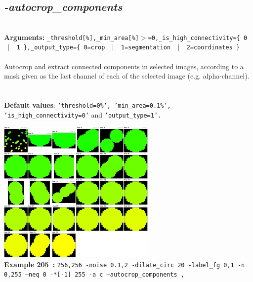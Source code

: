 \documentclass[a4paper,11pt,twoside]{book}
\begin{document}
\subsection{\emph{-autocrop\_components} }\vspace*{-0.5em}
~\\\textbf{Arguments: } 
{\small \texttt{\_threshold[\%],\_min\_area[\%]$>$=0,\_is\_high\_connectivity=\{ 0 ~$|$~ 1 \},\_output\_type=\{ 0=crop ~$|$~ 1=segmentation ~$|$~ 2=coordinates \}}}\\~\\
Autocrop and extract connected components in selected images, according to a mask given as the last channel of
each of the selected image (e.g. alpha-channel).
~\\~\\\textbf{Default values}: {\small \texttt{'threshold=0\%', 'min\_area=0.1\%', 'is\_high\_connectivity=0'} and \texttt{'output\_type=1'.}}
\begin{center}\includegraphics[keepaspectratio=true,height=7cm,width=\textwidth]{img/gmic_def205.jpg}\\
{\footnotesize \textbf{Example 205~:} \texttt{256,256 -noise 0.1,2 -dilate\_circ 20 -label\_fg 0,1 -n 0,255 --neq 0 -*[-1] 255 -a c --autocrop\_components ,}}
\end{center}
\end{document}
